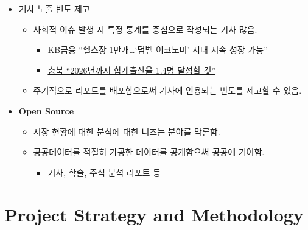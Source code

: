 \documentclass[
]{book}
\providecommand{\tightlist}{%
  \setlength{\itemsep}{0pt}\setlength{\parskip}{0pt}}
\begin{document}
\begin{itemize}
\item
  기사 노출 빈도 제고

  \begin{itemize}
  \item
    사회적 이슈 발생 시 특정 통계를 중심으로 작성되는 기사 많음.

    \begin{itemize}
    \item
      \href{https://view.asiae.co.kr/article/2020101109401531692}{KB금융 ``헬스장 1만개\ldots{}`덤벨 이코노미' 시대 지속 성장 가능''}
    \item
      \href{https://www.munhwa.com/news/view.html?no=2023040501071027045001}{충북 ``2026년까지 합계출산율 1.4명 달성할 것''}
    \end{itemize}
  \item
    주기적으로 리포트를 배포함으로써 기사에 인용되는 빈도를 제고할 수 있음.
  \end{itemize}
\item
  \textbf{Open Source}

  \begin{itemize}
  \item
    시장 현황에 대한 분석에 대한 니즈는 분야를 막론함.
  \item
    공공데이터를 적절히 가공한 데이터를 공개함으써 공공에 기여함.

    \begin{itemize}
    \tightlist
    \item
      기사, 학술, 주식 분석 리포트 등
    \end{itemize}
  \end{itemize}
\end{itemize}

\hypertarget{project-strategy-and-methodology}{%
\chapter{Project Strategy and Methodology}\label{project-strategy-and-methodology}}
\end{document}
